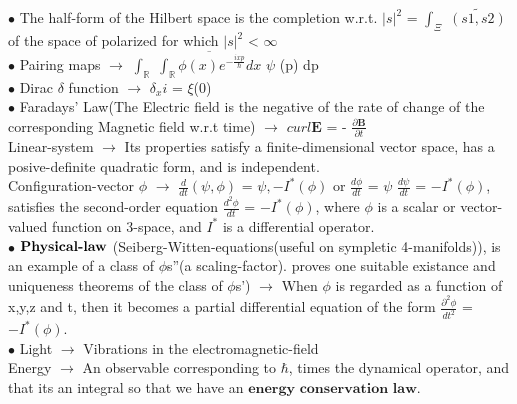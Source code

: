 \documentclass[a4paper, 10pt, onepage]{elegantbook}
\begin{document}
{$\bullet$ The half-form of the Hilbert space is the completion w.r.t. $\vert s \vert^2$ = $\int_\Xi$ ${\widetilde{(s1,s2)}}$  of the space
of polarized for which $\vert s \vert^2$ < $\infty$  \\
  
$\bullet$ Pairing maps $\longrightarrow$ $\int_\mathbb R$ $\overline {\int_\mathbb {R} \phi (x) e^{- \frac{{ixp}}{\hbar}} dx}$ $\psi$ (p) dp   \\
 
$\bullet$ Dirac $\delta$ function $\longrightarrow$ $\delta_xi$ = $\xi$(0)  \\

$\bullet$ Faradays' Law(The Electric field is the negative of the rate of change of the corresponding Magnetic field w.r.t time) $\longrightarrow$ $curl \mathbf E$ = - $\frac{\partial \mathbf B}{\partial t}$ \\
 
Linear-system $\longrightarrow$ Its properties satisfy a finite-dimensional vector space, has a posive-definite quadratic form,
and is independent. \\
 
Configuration-vector $\phi$ $\longrightarrow$ $\frac{d}{dt}(\psi, \phi)$ = $\psi, {-I}^*(\phi)$ or $\frac{d\phi}{dt}$ = $\psi$ $\frac{d\psi}{dt}$ = $-I^*(\phi)$,
satisfies the second-order equation $\frac{d^2\phi}{dt}$ = ${-I^*(\phi)}$, where $\phi$ is a scalar
or vector-valued function on 3-space, and ${I^*}$ is a differential operator. \\
 
$\bullet$ $\mathbf{\textbf{Physical-law\index{Physical-law}}}$ (Seiberg-Witten-equations(useful on sympletic 4-manifolds)), is an example of a class of $\phi$s''(a scaling-factor). proves one suitable existance and uniqueness theorems of the class of $\phi$s') $\longrightarrow$ When $\phi$ is regarded as a function of x,y,z and t, then it becomes a partial differential equation of the form $\frac{\partial^2 \phi}{dt^2}$ = ${-I^*}(\phi)$. \\
 
$\bullet$ Light $\longrightarrow$ Vibrations in the electromagnetic-field  \\

Energy $\longrightarrow$ An observable corresponding to $\hbar$, times the dynamical operator, and that its an integral
so that we have an $\mathbf{\textbf{energy conservation law}}$. \\
 
}
\end{document}
